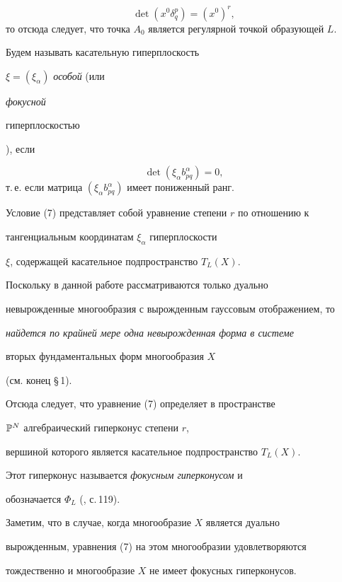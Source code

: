 $$


\det (x^0 \delta^p_q) = (x^0)^r,


$$
то отсюда следует, что точка $A_0$ является регулярной точкой образующей $L$.






Будем называть касательную гиперплоскость


$\xi = (\xi_\alpha)$ {\em особой} (или {\em фокусной


гиперплоскостью}), если


\begin{equation}


\label{eq:13}


\det (\xi_\alpha b^\alpha_{pq}) = 0,
\end{equation}
т.\,е. если матрица $(\xi_\alpha b^\alpha_{pq})$ имеет пониженный ранг.


Условие (7) представляет собой уравнение степени $r$ по отношению к


тангенциальным координатам $\xi_\alpha$ гиперплоскости


$\xi$, содержащей касательное подпространство $T_L (X)$.



Поскольку в данной работе рассматриваются только дуально


невырожденные многообразия с вырожденным гауссовым отображением, то


{\it найдется по крайней мере одна невырожденная форма в системе


вторых фундаментальных форм многообразия $X$} (см. конец \S\,1).


Отсюда следует, что уравнение (7) определяет в пространстве


$\Bbb{P}^N$ алгебраический гиперконус степени $r$,


вершиной которого является касательное подпространство $T_L (X)$.


Этот гиперконус называется {\em фокусным гиперконусом} и


обозначается $\Phi_L$ (\cite{AG93}, с.\,119).





Заметим, что в случае, когда многообразие $X$ является дуально


вырожденным, уравнения (7) на этом многообразии удовлетворяются


тождественно и многообразие $X$ не имеет фокусных гиперконусов.




